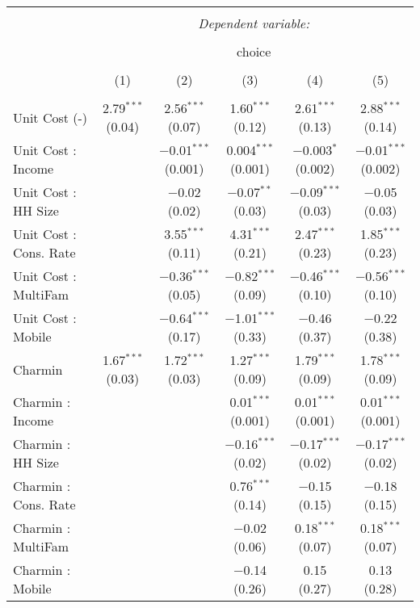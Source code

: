 
\begin{table}[!htbp] \centering 
  \caption{} 
  \label{tab:mnlChicagoObsHet} 
\begin{tabular}{@{\extracolsep{5pt}}lccccc} 
\\[-1.8ex]\hline 
\hline \\[-1.8ex] 
 & \multicolumn{5}{c}{\textit{Dependent variable:}} \\ 
\cline{2-6} 
\\[-1.8ex] & \multicolumn{5}{c}{choice} \\ 
\\[-1.8ex] & (1) & (2) & (3) & (4) & (5)\\ 
\hline \\[-1.8ex] 
 Unit Cost (-) & 2.79$^{***}$ (0.04) & 2.56$^{***}$ (0.07) & 1.60$^{***}$ (0.12) & 2.61$^{***}$ (0.13) & 2.88$^{***}$ (0.14) \\ 
  Unit Cost : Income &  & $-$0.01$^{***}$ (0.001) & 0.004$^{***}$ (0.001) & $-$0.003$^{*}$ (0.002) & $-$0.01$^{***}$ (0.002) \\ 
  Unit Cost : HH Size &  & $-$0.02 (0.02) & $-$0.07$^{**}$ (0.03) & $-$0.09$^{***}$ (0.03) & $-$0.05 (0.03) \\ 
  Unit Cost : Cons. Rate &  & 3.55$^{***}$ (0.11) & 4.31$^{***}$ (0.21) & 2.47$^{***}$ (0.23) & 1.85$^{***}$ (0.23) \\ 
  Unit Cost : MultiFam &  & $-$0.36$^{***}$ (0.05) & $-$0.82$^{***}$ (0.09) & $-$0.46$^{***}$ (0.10) & $-$0.56$^{***}$ (0.10) \\ 
  Unit Cost : Mobile &  & $-$0.64$^{***}$ (0.17) & $-$1.01$^{***}$ (0.33) & $-$0.46 (0.37) & $-$0.22 (0.38) \\ 
  Charmin & 1.67$^{***}$ (0.03) & 1.72$^{***}$ (0.03) & 1.27$^{***}$ (0.09) & 1.79$^{***}$ (0.09) & 1.78$^{***}$ (0.09) \\ 
  Charmin : Income &  &  & 0.01$^{***}$ (0.001) & 0.01$^{***}$ (0.001) & 0.01$^{***}$ (0.001) \\ 
  Charmin : HH Size &  &  & $-$0.16$^{***}$ (0.02) & $-$0.17$^{***}$ (0.02) & $-$0.17$^{***}$ (0.02) \\ 
  Charmin : Cons. Rate &  &  & 0.76$^{***}$ (0.14) & $-$0.15 (0.15) & $-$0.18 (0.15) \\ 
  Charmin : MultiFam &  &  & $-$0.02 (0.06) & 0.18$^{***}$ (0.07) & 0.18$^{***}$ (0.07) \\ 
  Charmin : Mobile &  &  & $-$0.14 (0.26) & 0.15 (0.27) & 0.13 (0.28) \\ 

\end{tabular}
\end{table}
